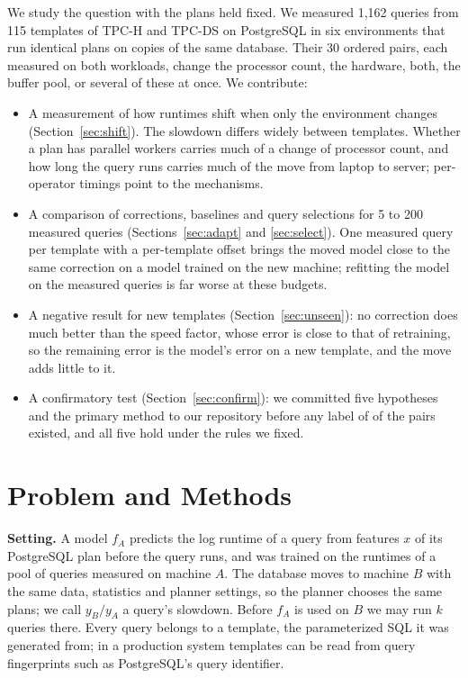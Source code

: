 \documentclass[sigconf,review]{acmart}
\begin{document}
We study the question with the plans held fixed. We measured 1,162 queries
from 115 templates of TPC-H and TPC-DS on PostgreSQL in six environments
that run identical plans on copies of the same database. Their 30 ordered
pairs, each measured on both workloads, change the processor count, the
hardware, both, the buffer pool, or several of these at once. We
contribute:
\begin{itemize}
\item A measurement of how runtimes shift when only the environment changes
  (Section~\ref{sec:shift}). The slowdown differs widely between templates.
  Whether a plan has parallel workers carries much of a change of processor
  count, and how long the query runs carries much of the move from laptop
  to server; per-operator timings point to the mechanisms.
\item A comparison of corrections, baselines and query selections for 5
  to 200 measured queries (Sections~\ref{sec:adapt} and \ref{sec:select}).
  One measured query per template with a per-template offset brings the
  moved model close to the same correction on a model trained on the new
  machine; refitting the model on the measured queries is far worse at
  these budgets.
\item A negative result for new templates (Section~\ref{sec:unseen}): no
  correction does much better than the speed factor, whose error is close
  to that of retraining, so the remaining error is the model's error on a
  new template, and the move adds little to it.
\item A confirmatory test (Section~\ref{sec:confirm}): we committed five
  hypotheses and the primary method to our repository before any label of
  \PHPairs{} of the pairs existed, and all five hold under the rules we
  fixed.
\end{itemize}

\section{Problem and Methods}
\label{sec:methods}

\textbf{Setting.} A model $f_A$ predicts the log runtime of a query from
features $x$ of its PostgreSQL plan before the query runs, and was trained
on the runtimes of a pool of queries measured on machine $A$. The database
moves to machine $B$ with the same data, statistics and planner settings, so
the planner chooses the same plans; we call $y_B/y_A$ a query's slowdown.
Before $f_A$ is used on $B$ we may run $k$ queries there. Every query
belongs to a template, the parameterized SQL it was generated from; in a
production system templates can be read from query fingerprints such as
PostgreSQL's query identifier.
\end{document}
